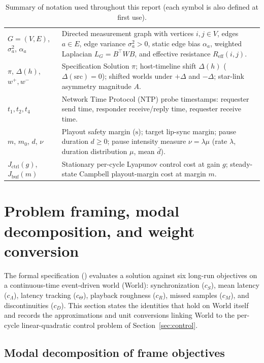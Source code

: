 \documentclass[11pt,a4paper]{article}
\DeclareRobustCommand{\lean}[1]{{\ttfamily\def\_{\textunderscore\allowbreak}#1}}
\theoremstyle{definition}
\begin{document}
\begin{table}[htb]
\begin{tabular}{@{}l >{\raggedright\arraybackslash}p{10.6cm}@{}}
$G = (V, E)$, $\sigma_a^2$, $\alpha_a$ & Directed measurement graph with vertices $i, j \in V$, edges $a \in E$, edge variance $\sigma_a^2 > 0$, static edge bias $\alpha_a$, weighted Laplacian $L_G = B^\top W B$, and effective resistance $R_{\mathrm{eff}}(i, j)$. \\
$\pi$, $\Delta(h)$, $w^+, w^-$ & Specification \lean{Solution} $\pi$; host-timeline shift $\Delta(h)$ ($\Delta(\mathrm{src}) = 0$); shifted worlds under $+\Delta$ and $-\Delta$; star-link asymmetry magnitude $A$. \\
$t_1, t_2, t_4$ & Network Time Protocol (NTP) probe timestamps: requester send time, responder receive/reply time, requester receive time. \\
$m$, $m_0$, $d$, $\nu$ & Playout safety margin ($\text{s}$); target lip-sync margin; pause duration $d \ge 0$; pause intensity measure $\nu = \lambda\mu$ (rate $\lambda$, duration distribution $\mu$, mean $\bar d$). \\
$J_{\mathrm{ctrl}}(g)$, $J_{\mathrm{buf}}(m)$ & Stationary per-cycle Lyapunov control cost at gain $g$; steady-state Campbell playout-margin cost at margin $m$. \\
\bottomrule
\end{tabular}
\caption{Summary of notation used throughout this report (each symbol is also defined at first use).}
\label{tab:notation}
\end{table}

\section{Problem framing, modal decomposition, and weight conversion}
\label{sec:framing}

The formal specification () evaluates a solution
against six long-run objectives on a continuous-time event-driven world
(\lean{World}): synchronization ($c_S$), mean latency ($c_\Lambda$), latency
tracking ($c_\Theta$), playback roughness ($c_R$), missed samples ($c_M$), and
discontinuities ($c_D$). This section states the identities that hold on
\lean{World} itself and records the approximations and unit conversions linking
\lean{World} to the per-cycle linear-quadratic control problem of
Section~\ref{sec:control}.

\subsection{Modal decomposition of frame objectives}
\end{document}
